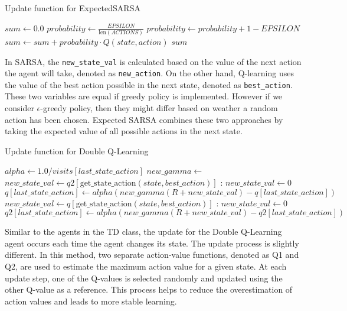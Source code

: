 \begin{algorithm}
\caption{Update function for ExpectedSARSA}\label{esUpdate}
\begin{algorithmic}[1]
\State $sum \gets 0.0$
\State $probability \gets \frac{EPSILON}{\text{len}(ACTIONS)}$
\State $probability \gets probability + 1 - EPSILON$
\EndIf
\State $sum \gets sum + probability \cdot Q(state, action)$
\EndFor
\State \Return $sum$
\EndFunction
\end{algorithmic}
\end{algorithm}

In SARSA, the \texttt{new\_state\_val} is calculated based on the value of the next action the agent will take, denoted as \texttt{new\_action}. On the other hand, Q-learning uses the value of the best action possible in the next state, denoted as \texttt{best\_action}. These two variables are equal if greedy policy is implemented. However if we consider $\epsilon$-greedy policy, then they might differ based on weather a random action has been chosen. Expected SARSA combines these two approaches by taking the expected value of all possible actions in the next state. 

\begin{algorithm}
\caption{Update function for Double Q-Learning}\label{dqlUpdate}
\begin{algorithmic}
\State $ alpha \gets 1.0 / visits[last\_state\_action]$
\State $ new\_gamma \gets $
\State $new\_state\_val \gets q2[\text{get\_state\_action}(state,best\_action)]$
:
\State $new\_state\_val \gets0$
\EndIf
\State $ q[last\_state\_action] \gets alpha(new\_gamma(R + new\_state\_val) - q[last\_state\_action])$
\Else
\State $new\_state\_val \gets q[\text{get\_state\_action}(state,best\_action)]$
:
\State $new\_state\_val \gets0$
\EndIf
\State $ q2[last\_state\_action] \gets alpha(new\_gamma(R + new\_state\_val) - q2[last\_state\_action])$
\EndIf
\end{algorithmic}
\end{algorithm}

Similar to the agents in the TD class, the update for the Double Q-Learning agent occurs each time the agent changes its state. The update process is slightly different. In this method, two separate action-value functions, denoted as Q1 and Q2, are used to estimate the maximum action value for a given state. At each update step, one of the Q-values is selected randomly and updated using the other Q-value as a reference. This process helps to reduce the overestimation of action values and leads to more stable learning.